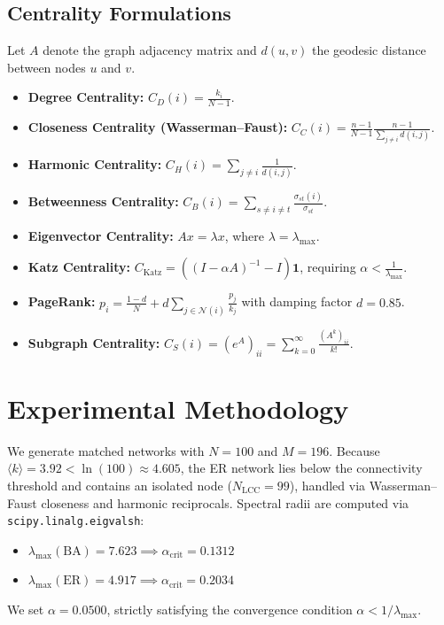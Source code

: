 \documentclass[11pt,a4paper]{article}
\begin{document}
\subsection{Centrality Formulations}
Let $A$ denote the graph adjacency matrix and $d(u, v)$ the geodesic distance between nodes $u$ and $v$.
\begin{itemize}
    \item \textbf{Degree Centrality:} $C_D(i) = \frac{k_i}{N-1}$.
    \item \textbf{Closeness Centrality (Wasserman--Faust):} $C_C(i) = \frac{n-1}{N-1} \frac{n-1}{\sum_{j \ne i} d(i, j)}$.
    \item \textbf{Harmonic Centrality:} $C_H(i) = \sum_{j \ne i} \frac{1}{d(i, j)}$.
    \item \textbf{Betweenness Centrality:} $C_B(i) = \sum_{s \ne i \ne t} \frac{\sigma_{st}(i)}{\sigma_{st}}$.
    \item \textbf{Eigenvector Centrality:} $A x = \lambda x$, where $\lambda = \lambda_{\max}$.
    \item \textbf{Katz Centrality:} $C_{\text{Katz}} = ((I - \alpha A)^{-1} - I) \mathbf{1}$, requiring $\alpha < \frac{1}{\lambda_{\max}}$.
    \item \textbf{PageRank:} $p_i = \frac{1-d}{N} + d \sum_{j \in \mathcal{N}(i)} \frac{p_j}{k_j}$ with damping factor $d=0.85$.
    \item \textbf{Subgraph Centrality:} $C_S(i) = (e^A)_{ii} = \sum_{k=0}^\infty \frac{(A^k)_{ii}}{k!}$.
\end{itemize}

\section{Experimental Methodology}
We generate matched networks with $N=100$ and $M=196$. Because $\langle k \rangle = 3.92 < \ln(100) \approx 4.605$, the ER network lies below the connectivity threshold and contains an isolated node ($N_{\text{LCC}}=99$), handled via Wasserman--Faust closeness and harmonic reciprocals. Spectral radii are computed via \texttt{scipy.linalg.eigvalsh}:
\begin{itemize}
    \item $\lambda_{\max}(\text{BA}) = 7.623 \implies \alpha_{\text{crit}} = 0.1312$
    \item $\lambda_{\max}(\text{ER}) = 4.917 \implies \alpha_{\text{crit}} = 0.2034$
\end{itemize}
We set $\alpha = 0.0500$, strictly satisfying the convergence condition $\alpha < 1/\lambda_{\max}$.
\end{document}
